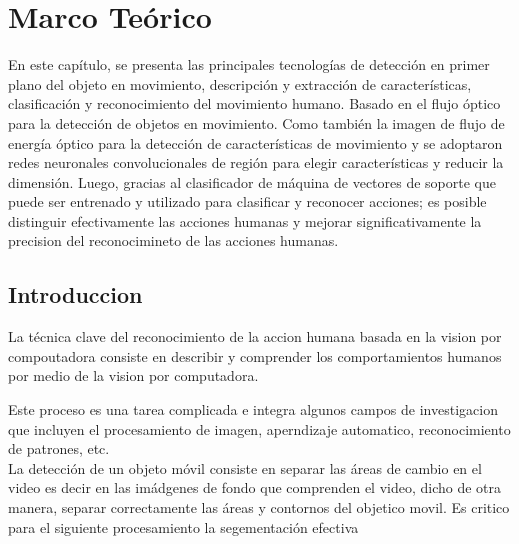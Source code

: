 \chapter{Marco Teórico}

En este capítulo, se presenta las principales tecnologías de detección en primer 
plano del objeto en movimiento, descripción y extracción de características, 
clasificación y reconocimiento del movimiento humano. Basado en el flujo óptico
para la detección de objetos en movimiento. Como también la imagen de flujo de
energía óptico para la detección de características de movimiento y se 
adoptaron redes neuronales convolucionales de región para elegir 
características y reducir la dimensión. Luego, gracias al clasificador
de máquina de vectores de soporte que puede ser entrenado y utilizado 
para clasificar y reconocer acciones; es posible distinguir efectivamente
las acciones humanas y mejorar significativamente la precision del reconocimineto de las acciones humanas.

\section{Introduccion}

La técnica clave del reconocimiento de la accion humana basada en la
vision  por compoutadora consiste en describir y comprender los comportamientos humanos
por medio de la vision por computadora.

Este proceso es una tarea complicada e integra algunos campos de investigacion
que incluyen el procesamiento de imagen, aperndizaje automatico, reconocimiento de patrones, etc.\\

La detección de un objeto móvil consiste en separar las áreas de cambio en el video
es decir en las imádgenes de fondo que comprenden el video, dicho de otra manera, separar
correctamente las áreas y contornos del objetico movil. 
Es critico para el siguiente procesamiento la segementación efectiva 